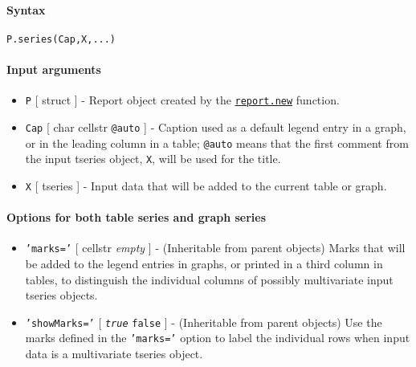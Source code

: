 


	\paragraph{Syntax}\label{syntax}

\begin{verbatim}
P.series(Cap,X,...)
\end{verbatim}

\paragraph{Input arguments}\label{input-arguments}

\begin{itemize}
\item
  \texttt{P} {[} struct {]} - Report object created by the
  \href{report/new}{\texttt{report.new}} function.
\item
  \texttt{Cap} {[} char \textbar{} cellstr \textbar{} \texttt{@auto} {]}
  - Caption used as a default legend entry in a graph, or in the leading
  column in a table; \texttt{@auto} means that the first comment from
  the input tseries object, \texttt{X}, will be used for the title.
\item
  \texttt{X} {[} tseries {]} - Input data that will be added to the
  current table or graph.
\end{itemize}

\paragraph{Options for both table series and graph
series}\label{options-for-both-table-series-and-graph-series}

\begin{itemize}
\item
  \texttt{'marks='} {[} cellstr \textbar{} \emph{empty} {]} -
  (Inheritable from parent objects) Marks that will be added to the
  legend entries in graphs, or printed in a third column in tables, to
  distinguish the individual columns of possibly multivariate input
  tseries objects.
\item
  \texttt{'showMarks='} {[} \emph{\texttt{true}} \textbar{}
  \texttt{false} {]} - (Inheritable from parent objects) Use the marks
  defined in the \texttt{'marks='} option to label the individual rows
  when input data is a multivariate tseries object.
\end{itemize}

